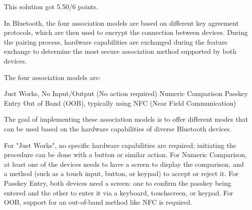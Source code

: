 \begin{solution}
    This solution got 5.50/6 points.

    In Bluetooth, the four association models are based on different key agreement protocols, which are then used to encrypt the connection between devices. During the pairing process, hardware capabilities are exchanged during the feature exchange to determine the most secure association method supported by both devices.

    The four association models are:

    Just Works, No Input/Output (No action required)
    Numeric Comparison
    Passkey Entry
    Out of Band (OOB), typically using NFC (Near Field Communication)

    The goal of implementing these association models is to offer different modes that can be used based on the hardware capabilities of diverse Bluetooth devices.

    For "Just Works", no specific hardware capabilities are required; initiating the procedure can be done with a button or similar action. For Numeric Comparison, at least one of the devices needs to have a screen to display the comparison, and a method (such as a touch input, button, or keypad) to accept or reject it. For Passkey Entry, both devices need a screen: one to confirm the passkey being entered and the other to enter it via a keyboard, touchscreen, or keypad. For OOB, support for an out-of-band method like NFC is required.
\end{solution}




